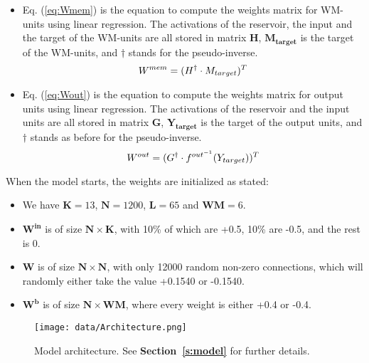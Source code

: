 \begin{itemize}
    \item Eq. (\ref{eq:Wmem}) is the equation to compute the weights matrix for WM-units using linear regression. The activations of the reservoir, the input and the target of the WM-units are all stored in matrix $\mathbf{H}$, $\mathbf{M_{target}}$ is the target of the WM-units, and $\dagger$ stands for the pseudo-inverse.
    \begin{equation} \label{eq:Wmem}
        W^{mem} = (H^{\dagger} \cdot M_{target})^T\\
    \end{equation}
    
    \item Eq. (\ref{eq:Wout}) is the equation to compute the weights matrix for output units using linear regression. The activations of the reservoir and the input units are all stored in matrix $\mathbf{G}$, $\mathbf{Y_{target}}$ is the target of the output units, and $\dagger$ stands as before for the pseudo-inverse.
    \begin{equation} \label{eq:Wout}
        W^{out} = (G^{\dagger} \cdot f^{out^{-1}}(Y_{target}))^T\\
    \end{equation}
    
\end{itemize}

When the model starts, the weights are initialized as stated:
\begin{itemize}
    \item We have $\mathbf{K}=13$, $\mathbf{N}=1200$, $\mathbf{L}=65$ and $\mathbf{WM}=6$.
    \item $\mathbf{W^{in}}$ is of size $\mathbf{N \times K}$, with 10\% of which are +0.5, 10\% are -0.5, and the rest is 0.
    \item $\mathbf{W}$ is of size $\mathbf{N \times N}$, with only 12000 random non-zero connections, which will randomly either take the value +0.1540 or -0.1540.
    \item $\mathbf{W^{b}}$ is of size $\mathbf{N \times WM}$, where every weight is either +0.4 or -0.4.
    
\end{itemize}

\begin{figure}[h]
    \centering
    \texttt{[image: data/Architecture.png]}
    \caption{Model architecture. See \textbf{Section~\ref{s:model}} for further details.}
    \label{fig:architecture}
\end{figure}

